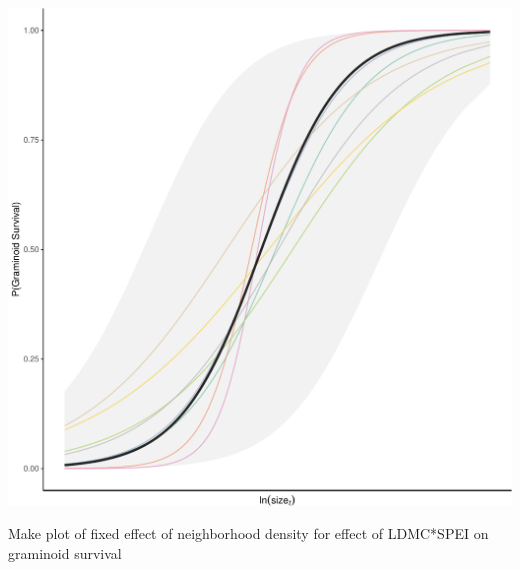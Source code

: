 \documentclass[
]{article}
\begin{document}
\includegraphics{figures/unnamed-chunk-7-1.pdf}

Make plot of fixed effect of neighborhood density for effect of
LDMC*SPEI on graminoid survival
\end{document}

